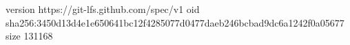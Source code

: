 version https://git-lfs.github.com/spec/v1
oid sha256:3450d13d4e1e650641bc12f4285077d0477daeb246bcbad9dc6a1242f0a05677
size 131168
